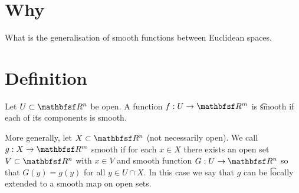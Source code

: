 
\section*{Why}

What is the generalisation of smooth functions between Euclidean spaces.

\section*{Definition}

Let $U \subset \R ^n$ be open.
A function $f: U \to \R ^m$ is \t{smooth} if each of its components is smooth.

More generally, let $X \subset \R ^n$ (not necessarily open).
We call $g: X \to \R ^m$ smooth if for each $x \in X$ there exists an open set $V \subset \R ^n$ with $x \in V$ and smooth function $G: U \to \R ^n$ so that $G(y) = g(y)$ for all $y \in U \cap  X$.
In this case we say that $g$ can be \t{locally extended} to a smooth map on open sets.

\blankpage